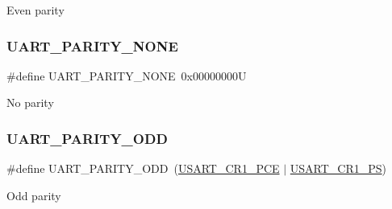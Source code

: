 Even parity \mbox{\label{group___u_a_r_t___parity_ga270dea6e1a92dd83fe58802450bdd60c}} 
\subsubsection{\texorpdfstring{UART\_PARITY\_NONE}{UART\_PARITY\_NONE}}
{\footnotesize\ttfamily \#define U\+A\+R\+T\+\_\+\+P\+A\+R\+I\+T\+Y\+\_\+\+N\+O\+NE~0x00000000U}

No parity \mbox{\label{group___u_a_r_t___parity_ga229615e64964f68f7a856ea6ffea359e}} 
\subsubsection{\texorpdfstring{UART\_PARITY\_ODD}{UART\_PARITY\_ODD}}
{\footnotesize\ttfamily \#define U\+A\+R\+T\+\_\+\+P\+A\+R\+I\+T\+Y\+\_\+\+O\+DD~(\mbox{\hyperlink{group___peripheral___registers___bits___definition_ga60f8fcf084f9a8514efafb617c70b074}{U\+S\+A\+R\+T\+\_\+\+C\+R1\+\_\+\+P\+CE}} $\vert$ \mbox{\hyperlink{group___peripheral___registers___bits___definition_ga2e159d36ab2c93a2c1942df60e9eebbe}{U\+S\+A\+R\+T\+\_\+\+C\+R1\+\_\+\+PS}})}

Odd parity 